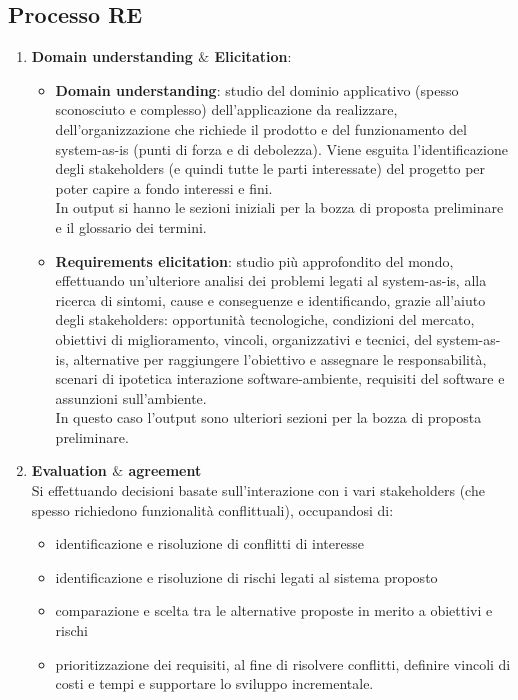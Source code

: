 \subsection{Processo RE}
\begin{enumerate}
    \item \textbf{Domain understanding $\&$ Elicitation}:
        \begin{itemize}
            \item \textbf{Domain understanding}:  
            studio del dominio applicativo (spesso sconosciuto e complesso) dell’applicazione da realizzare, dell’organizzazione che richiede il prodotto e del funzionamento del system-as-is (punti di forza e di debolezza). Viene esguita l'identificazione degli stakeholders (e quindi tutte le parti interessate) del progetto per poter capire a fondo interessi e fini.\\
            In output si hanno le sezioni iniziali per la bozza di proposta preliminare e il glossario dei termini.
            \item \textbf{Requirements elicitation}: studio più approfondito del mondo, effettuando un’ulteriore analisi dei problemi legati al system-as-is, alla ricerca di sintomi, cause e conseguenze e identificando, grazie all’aiuto degli stakeholders: opportunità tecnologiche, condizioni del mercato, obiettivi di miglioramento, vincoli, organizzativi e tecnici, del system-as-is, alternative per raggiungere l’obiettivo e assegnare le responsabilità, scenari di ipotetica interazione software-ambiente, requisiti del software e assunzioni sull’ambiente.\\
            In questo caso l'output sono ulteriori sezioni per la bozza di proposta preliminare.
        \end{itemize}
    \item \textbf{Evaluation $\&$ agreement}\\Si effettuando decisioni basate sull’interazione con i vari stakeholders (che        spesso richiedono funzionalità conflittuali), occupandosi di:
        \begin{itemize}
            \item identificazione e risoluzione di conflitti di interesse
           \item identificazione e risoluzione di rischi legati al sistema proposto
           \item comparazione e scelta tra le alternative proposte in merito a obiettivi e rischi
           \item prioritizzazione dei requisiti, al fine di risolvere conflitti, definire vincoli di costi e tempi e supportare lo sviluppo incrementale.

\end{itemize}
\end{enumerate}
